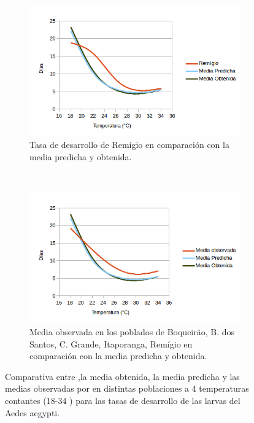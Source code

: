 \begin{figure}[!htbp]
\begin{subfigure}[b]{0.45\textwidth}
    \end{subfigure}
    \begin{subfigure}[t]{0.45\textwidth}
            \includegraphics[width=\textwidth]{capitulo-6/graphics/desarrollo-larva-5.png}
            \caption{Tasa de desarrollo de Remígio en comparación con la media predicha y obtenida.}
    \end{subfigure}
    ~~~~
    \begin{subfigure}[t]{0.45\textwidth}
            \includegraphics[width=\textwidth]{capitulo-6/graphics/desarrollo-larva-6.png}
            \caption{Media observada en los poblados de Boqueirão, B. dos Santos, C. Grande, Itaporanga, Remígio en comparación con la media predicha y obtenida.}

    \end{subfigure}

    \caption{\label{fig:desarrollo-larva-baserra2006}
    Comparativa entre ,la media obtenida, la media predicha y las medias observadas por \cite{
    BESERRA2006} en distintas poblaciones a 4 temperaturas contantes (18-34 \textcelsius) para
    las tasas de desarrollo de las larvas del Aedes aegypti.}
\end{figure}


